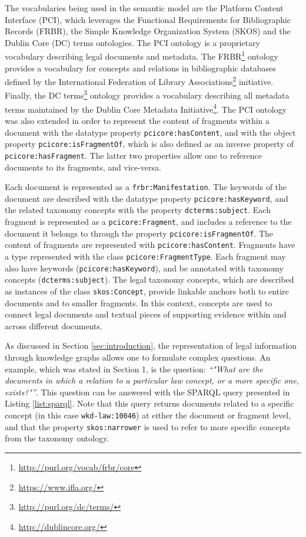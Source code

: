 \documentclass[runningheads]{llncs}
\begin{document}
The vocabularies being used in the semantic model are the Platform Content Interface (PCI), which leverages the Functional Requirements for Bibliographic Records (FRBR), the Simple Knowledge Organization System (SKOS) and the Dublin Core (DC) terms ontologies. The PCI ontology is a proprietary vocabulary describing legal documents and metadata. The FRBR\footnote{\url{http://purl.org/vocab/frbr/core}} ontology provides a vocabulary for concepts and relations in bibliographic databases defined by the International Federation of Library Associations\footnote{\url{https://www.ifla.org/}} initiative. Finally, the DC terms\footnote{\url{http://purl.org/dc/terms/}}  ontology provides a vocabulary describing all metadata terms maintained by the Dublin Core Metadata Initiative\footnote{\url{http://dublincore.org/}}. The PCI ontology was also extended in order to represent the content of fragments within a document with the datatype property \texttt{pcicore:hasContent}, and with the object property \texttt{pcicore:isFragmentOf}, which is also defined as an inverse property of \texttt{pcicore:hasFragment}. The latter two properties allow one to reference documents to its fragments, and vice-versa. 

Each document is represented as a \texttt{frbr:Manifestation}. The keywords of the document are described with the datatype property \texttt{pcicore:hasKeyword}, and the related taxonomy concepts with the property \texttt{dcterms:subject}. Each fragment is represented as a \texttt{pcicore:Fragment}, and includes a reference to the document it belongs to through the property \texttt{pcicore:isFragmentOf}. The content of fragments are represented with \texttt{pcicore:hasContent}. Fragments have a type represented with the class \texttt{pcicore:FragmentType}. Each fragment may also have keywords (\texttt{pcicore:hasKeyword}), and be annotated with taxonomy concepts (\texttt{dcterms:subject}). The legal taxonomy concepts, which are described as instances of the class \texttt{skos:Concept}, provide linkable anchors both to entire documents and to smaller fragments. In this context, concepts are used to connect legal documents and textual pieces of supporting evidence within and across different documents.

As discussed in Section \ref{sec:introduction}, the representation of legal information through knowledge graphs allows one to formulate complex questions. An example, which was stated in Section 1, is the question: \textit{“"What are the documents in which a relation to a particular law concept, or a more specific one, exists?"”}. This question can be answered with the SPARQL query presented in Listing \ref{list:sparql}. Note that this query returns documents related to a specific concept (in this case \texttt{wkd-law:10046}) at either the document or fragment level, and that the property \texttt{skos:narrower} is used to refer to more specific concepts from the taxonomy ontology.
\end{document}
